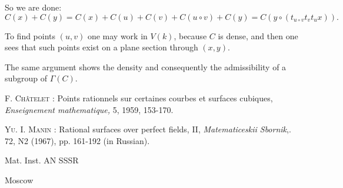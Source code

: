 So we are done:
$$
C(x)+C(y)=C(x)+C(u)+C(v)+C(u\circ v)+C(y)=C(y\circ (t_{u\circ v}t_{v}t_{u}x)).
$$

To find points $(u,v)$ one may work in $V(k)$, because $C$ is dense, and then one sees that such points exist on a plane section through $(x,y)$.

The same argument shows the density and consequently the admissibility of a subgroup of $\Gamma(C)$.

\begin{thebibliography}{99}
 \textsc{F. Ch\^atelet :} Points rationnels sur certaines courbes et surfaces cubiques, {\em Enseignement mathematique,} 5, 1959, 153-170.

 \textsc{Yu. I. Manin :} Rational surfaces over perfect fields, II, {\em Matematiceskii Sbornik},. 72, N2 (1967), pp. 161-192 (in Russian).
\end{thebibliography}

\bigskip
\noindent
{\small Mat. Inst. AN SSSR}

\noindent
{\small Moscow}



